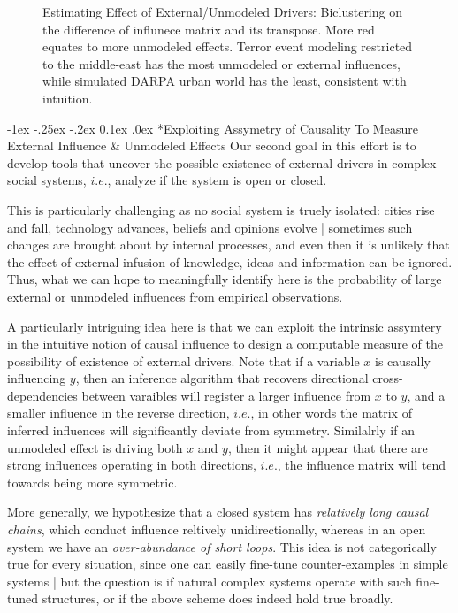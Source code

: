 \documentclass[onecolumn, compsoc,11pt]{IEEEtran}
\makeatletter
\renewcommand\subsection{\@startsection {section}{1}{\z@}%
  {-1ex \@plus -.25ex \@minus -.2ex}%
  {0.1ex \@plus.0ex}%
  {\fontsize{11}{10}\selectfont\bfseries\sffamily\color{DodgerBlue4}}}
\renewcommand{\captionN}[1]{\caption{\color{CadetBlue4!80!black} \sffamily \fontsize{10}{11}\selectfont #1  }}
\makeatother
\begin{document}
\begin{figure}
\begin{tikzpicture}[font=\bf\sffamily\fontsize{8}{8}\selectfont]
  \end{tikzpicture}
  \captionN{Estimating Effect of External/Unmodeled Drivers: Biclustering on the difference of influnece matrix and its transpose. {\color{Red1} More red} equates to more unmodeled effects. Terror event modeling restricted to the middle-east has the most unmodeled or external influences, while simulated DARPA urban world has the least, consistent with intuition. }\label{figcls}
\end{figure}

\subsection*{Exploiting Assymetry of Causality To Measure   External Influence \& Unmodeled Effects}
Our second goal in this effort is  to  develop tools that
uncover the possible existence of external drivers in  complex social systems, $i.e.$, analyze if the system is open or closed.
 
This is particularly challenging as no social system is truely isolated: cities rise and fall, technology advances, beliefs and opinions evolve | sometimes such changes are brought about by internal processes, and even then it is unlikely that the effect of external infusion of knowledge, ideas and information can be ignored. Thus, what we can hope to meaningfully  identify here is the probability of large external or unmodeled  influences from empirical observations.

A particularly intriguing idea here is that we can exploit the intrinsic assymtery in the intuitive  notion of causal influence to design a computable measure of the possibility of existence of external drivers. Note that if a variable $x$ is causally influencing $y$, then an inference algorithm that recovers directional cross-dependencies between varaibles will register a larger influence from $x$ to $y$, and a smaller influence in the reverse direction, $i.e.$, in other words the matrix of inferred influences will significantly deviate from symmetry. Similalrly if an unmodeled effect is driving both $x$ and $y$, then it might appear that there are strong influences operating in both directions, $i.e.$, the influence matrix will tend towards being more symmetric.

More generally, we hypothesize that a closed system has \textit{relatively long causal chains}, which conduct influence reltively unidirectionally, whereas in an open system we have an \textit{over-abundance of short loops}. This idea is not categorically true for every situation, since one can easily fine-tune counter-examples in simple systems | but the question is if natural complex systems operate with  such fine-tuned structures, or if the above scheme does indeed hold true broadly.
\end{document}
